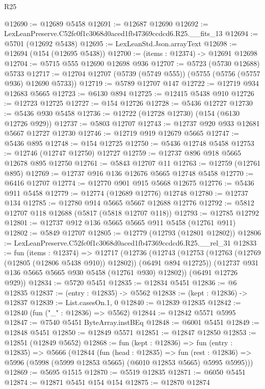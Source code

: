 \begin{lexlean}{R25}
\begin{coremodule}
@12690 := @12689 @5458
@12691 := @12687 @12690
@12692 := LexLeanPreserve.C52fc0f1c3068d0aced1fb47369ccdcd6.R25.__fits_13
@12694 := @5701 (@12692 @5438)
@12695 := LexLeanStd.Json.arrayText
@12698 := @12694 (@154 (@12695 @5438))
@12700 := (items : @12374) -> @12691 @12698
@12704 := @5715 @555 @12690 @12698 @936
@12707 := @5723 (@5730 @12688) @5733
@12717 := @12704 @12707 (@5739 (@5749 @555)) (@5755 (@5756 (@5757 @936) @12690 @5733))
@12719 := @5789 @12707 @147
@12722 := @12719 @934 @12683 @5665
@12723 := @6130 @894
@12725 := @12415 @5438 @910
@12726 := @12723 @12725
@12727 := @154 @12726
@12728 := @5436 @12727
@12730 := @5436 @930 @5458
@12736 := @12722 (@12728 @12730) (@154 (@6130 @12726 @929))
@12737 := @5803 @12707
@12743 := @12737 @920 @933 @12681 @5667 @12727 @12730
@12746 := @12719 @919 @12679 @5665
@12747 := @5436 @895
@12748 := @154 @12725
@12750 := @5436 @12748 @5458
@12753 := @12746 (@12747 @12750) @12727
@12759 := @12737 @896 @918 @5665 @12678 @895 @12750
@12761 := @5843 @12707 @11
@12763 := @12759 (@12761 @895)
@12769 := @12737 @916 @136 @12676 @5665 @12748 @5458
@12770 := @6416 @12707
@12774 := @12770 @901 @915 @5668 @12675
@12776 := @5436 @911 @5458
@12779 := @12774 (@12689 @12776) @12748
@12780 := @12737 @134
@12785 := @12780 @914 @5665 @5667 @12688 @12776
@12792 := @5812 @12707 @118 @12688 (@5817 (@5818 @12707 @118))
@12793 := @12785 @12792
@12801 := @12737 @912 @136 @5665 @5665 @911 @5458 (@12761 @911)
@12802 := @5849 @12707
@12805 := @12779 (@12793 (@12801 @12802))
@12806 := LexLeanPreserve.C52fc0f1c3068d0aced1fb47369ccdcd6.R25.__rel_31
@12833 := fun (items : @12374) =>
  @12717
    (@12736
      (@12743
        (@12753 (@12763 (@12769 (@12805 (@12806 @5438 @910)) @12802)) (@6491 @894 @12725))
        (@12737 @931 @136 @5665 @5665 @930 @5458 (@12761 @930) @12802))
      (@6491 @12726 @929))
@12834 := @5720 @5451
@12835 := @12834 @5451
@12836 := @6 @12835
@12837 := (entry : @12835) -> @5562
@12838 := (kept : @12836) -> @12837
@12839 := List.casesOn.{1, 0}
@12840 := @12839 @12835
@12842 := @12840 (fun ("_" : @12836) => @5562)
@12844 := @12842 @5571 @5995
@12847 := @7540 @5451 ByteArray.instBEq
@12848 := @6001 @5451
@12849 := @12848 @5451
@12850 := @12849 @5571
@12851 := @12847 @12850
@12853 := @12851 (@12849 @5652)
@12868 := fun (kept : @12836) =>
  fun (entry : @12835) =>
  @5666
    (@12844
      (fun (head : @12835) =>
      fun (rest : @12836) => @5996 (@5998 (@5999 @12853 @5665) (@6010 @12853 @5665) @5995 @5995)))
@12869 := @5695 @1515
@12870 := @5519 @12835
@12871 := @6050 @5451
@12874 := @12871 @5451 @154 @154
@12875 := @12870 @12874

\end{coremodule}
\end{lexlean}
